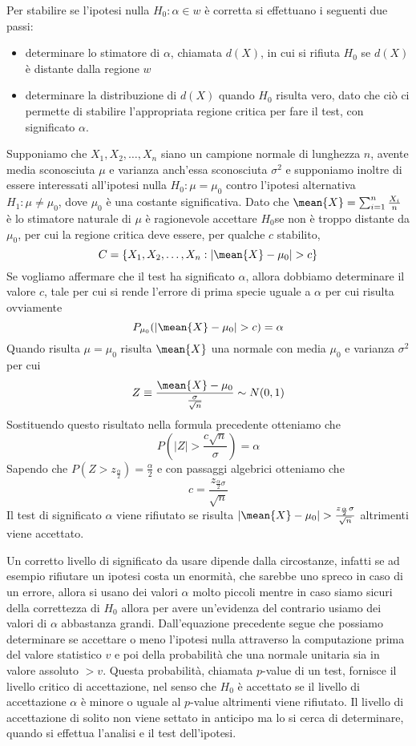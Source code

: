 Per stabilire se l'ipotesi nulla $H_0:\alpha \in w$ è corretta si effettuano i seguenti due passi:
\begin{itemize}
    \item determinare lo stimatore di $\alpha$, chiamata $d(X)$, in cui si rifiuta $H_0$ 
          se $d(X)$ è distante dalla regione $w$
    \item determinare la distribuzione di $d(X)$ quando $H_0$ risulta vero, dato che ciò ci permette di stabilire
          l'appropriata regione critica per fare il test, con significato $\alpha$.
\end{itemize}
Supponiamo che $X_1, X_2, \dots, X_n$ siano un campione normale di lunghezza $n$, avente media sconosciuta $\mu$ e
varianza anch'essa sconosciuta $\sigma^2$ e supponiamo inoltre di essere interessati all'ipotesi nulla $H_0:\mu = \mu_0$ 
contro l'ipotesi alternativa $H_1:\mu \neq \mu_0$, dove $\mu_0$ è una costante significativa.\newline
Dato che $\mean{X} = \sum _{i = 1}^n \frac{X_i}{n}$ è lo stimatore naturale di $\mu$ è ragionevole accettare $H_0$se non
è troppo distante da $\mu_0$, per cui la regione critica deve essere, per qualche $c$ stabilito,
\[ C = \{X_1, X_2, \dots, X_n : |\mean{X} - \mu_0| > c \} \]
Se vogliamo affermare che il test ha significato $\alpha$, allora dobbiamo determinare il valore $c$, tale per cui si
rende l'errore di prima specie uguale a $\alpha$ per cui risulta ovviamente
\[ P_{\mu_0}(|\mean{X} - \mu_0| > c) = \alpha \]
Quando risulta $\mu = \mu_0$ risulta $\mean{X}$ una normale con media $\mu_0$ e varianza $\sigma^2$ per cui 
\[ Z \equiv \frac{\mean{X} - \mu_0}{\frac{\sigma}{\sqrt{n}}} \sim N(0, 1) \]
Sostituendo questo risultato nella formula precedente otteniamo che
\[ P(|Z| > \frac{c \sqrt{n}}{\sigma}) = \alpha \]
Sapendo che $P(Z > z_{\frac{\alpha}{2}}) = \frac{\alpha}{2}$ e con passaggi algebrici otteniamo che 
\[ c = \frac{z_{\frac{\alpha}{2} \sigma}}{\sqrt{n}} \]
Il test di significato $\alpha$ viene rifiutato se risulta $|\mean{X} - \mu_0| > \frac{z_{\frac{\alpha}{2}}
\sigma}{\sqrt{n}}$ altrimenti viene accettato.

Un corretto livello di significato da usare dipende dalla circostanze, infatti se ad esempio rifiutare un ipotesi costa
un enormità, che sarebbe uno spreco in caso di un errore, allora si usano dei valori $\alpha$ molto piccoli
mentre in caso siamo sicuri della correttezza di $H_0$ allora per avere un'evidenza del contrario usiamo dei valori di
$\alpha$ abbastanza grandi.\newline
Dall'equazione precedente segue che possiamo determinare se accettare o meno l'ipotesi nulla attraverso la computazione prima del
valore statistico $v$ e poi della probabilità che una normale unitaria sia in valore assoluto $> v$.\newline
Questa probabilità, chiamata $p$-value di un test, fornisce il livello critico di accettazione, nel senso che $H_0$
è accettato se il livello di accettazione $\alpha$ è minore o uguale al $p$-value altrimenti viene rifiutato.\newline
Il livello di accettazione di solito non viene settato in anticipo ma lo si cerca di determinare, quando si effettua
l'analisi e il test dell'ipotesi.

